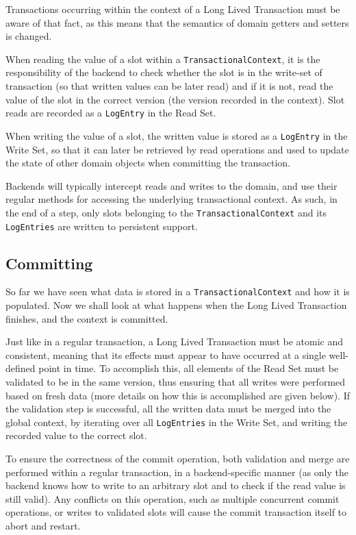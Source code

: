 Transactions occurring within the context of a Long Lived Transaction
must be aware of that fact, as this means that the semantics of domain
getters and setters is changed.

When reading the value of a slot within a
\texttt{TransactionalContext}, it is the responsibility of the backend
to check whether the slot is in the write-set of transaction (so that
written values can be later read) and if it is not, read the value of
the slot in the correct version (the version recorded in the
context). Slot reads are recorded as a \texttt{LogEntry} in the Read
Set.

When writing the value of a slot, the written value is stored as a
\texttt{LogEntry} in the Write Set, so that it can later be retrieved
by read operations and used to update the state of other domain
objects when committing the transaction.

Backends will typically intercept reads and writes to the domain, and
use their regular methods for accessing the underlying transactional
context. As such, in the end of a step, only slots belonging to the
\texttt{TransactionalContext} and its \texttt{LogEntries} are written
to persistent support.

\subsection{Committing}

So far we have seen what data is stored in a
\texttt{TransactionalContext} and how it is populated. Now we shall
look at what happens when the Long Lived Transaction finishes, and the
context is committed.

Just like in a regular transaction, a Long Lived Transaction must be
atomic and consistent, meaning that its effects must appear to have
occurred at a single well-defined point in time. To accomplish this,
all elements of the Read Set must be validated to be in the same
version, thus ensuring that all writes were performed based on fresh
data (more details on how this is accomplished are given below). If
the validation step is successful, all the written data must be merged
into the global context, by iterating over all \texttt{LogEntries} in
the Write Set, and writing the recorded value to the correct slot.

To ensure the correctness of the commit operation, both validation and
merge are performed within a regular transaction, in a
backend-specific manner (as only the backend knows how to write to an
arbitrary slot and to check if the read value is still valid). Any
conflicts on this operation, such as multiple concurrent commit
operations, or writes to validated slots will cause the commit
transaction itself to abort and restart.

